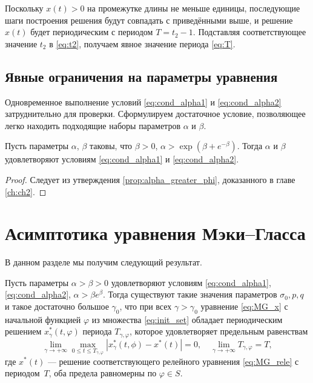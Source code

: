  Поскольку $x(t) > 0$ на промежутке длины не меньше единицы, последующие шаги построения решения будут совпадать с приведёнными выше, и решение $x(t)$ будет периодическим с периодом $T = t_2 - 1$. Подставляя соответствующее значение $t_2$ в \eqref{eq:t2}, получаем явное значение периода \eqref{eq:T}.


\subsection{Явные ограничения на параметры уравнения}

Одновременное выполнение условий \eqref{eq:cond_alpha1} и \eqref{eq:cond_alpha2} затруднительно для проверки. Сформулируем достаточное условие, позволяющее легко находить подходящие наборы параметров $\alpha$ и $\beta$.

\begin{theorem}
Пусть параметры $\alpha$, $\beta$ таковы, что $\beta > 0$, $\alpha > \exp(\beta + e^{-\beta})$. Тогда $\alpha$ и $\beta$ удовлетворяют условиям \eqref{eq:cond_alpha1} и \eqref{eq:cond_alpha2}.
\end{theorem}
\begin{proof}
	Следует из утверждения \ref{prop:alpha_greater_phi}, доказанного в главе \ref{ch:ch2}.
\end{proof}

\section{Асимптотика уравнения Мэки--Гласса}

В данном разделе мы получим следующий результат.

\begin{theorem}
    \label{thm:existence}
Пусть параметры $\alpha > \beta > 0$ удовлетворяют условиям \eqref{eq:cond_alpha1}, \eqref{eq:cond_alpha2}, $\alpha > \beta e^{\beta}$. Тогда существуют такие значения параметров $\sigma_0, p, q$ и такое достаточно большое $\gamma_0$, что при всех $\gamma > \gamma_0$ уравнение \eqref{eq:MG_x} с начальной функцией $\varphi$ из множества \eqref{eq:init_set} обладает периодическим решением $x^*_\gamma(t, \varphi)$ периода $T_{\gamma, \varphi}$, которое удовлетворяет предельным равенствам 
\begin{equation}
\label{eq:lim_x*}
	\lim_{\gamma\to+\infty}\max_{0\leqslant t\leqslant T_{\gamma, \varphi}}|x_{\gamma}^*(t, \phi)-x^*(t)|=0,\quad \lim_{\gamma\to+\infty}T_{\gamma, \varphi} = T,
\end{equation}
где $x^*(t)$ --- решение соответствующего релейного уравнения \eqref{eq:MG_rele} с периодом~$T$, оба предела равномерны по $\varphi \in S$. 
\end{theorem}

